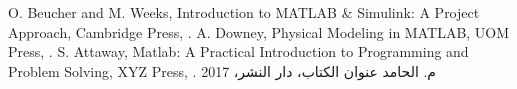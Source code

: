 \documentclass[a4 paper]{report}
\theoremstyle{mystyle}
\theoremstyle{Excercises}
\begin{document}

{}
\begin{thebibliography}{10}
O. Beucher and M. Weeks, 
\newblock Introduction to MATLAB \& Simulink: A Project Approach,
\newblock Cambridge Press, 
.
A. Downey, 
\newblock Physical Modeling in MATLAB,
\newblock UOM Press,
.
S. Attaway, 
\newblock Matlab: A Practical Introduction to Programming and Problem Solving,
\newblock XYZ Press,
.
م. الحامد
\newblock عنوان الكتاب، دار النشر، 2017
\end{thebibliography}
\end{document}
